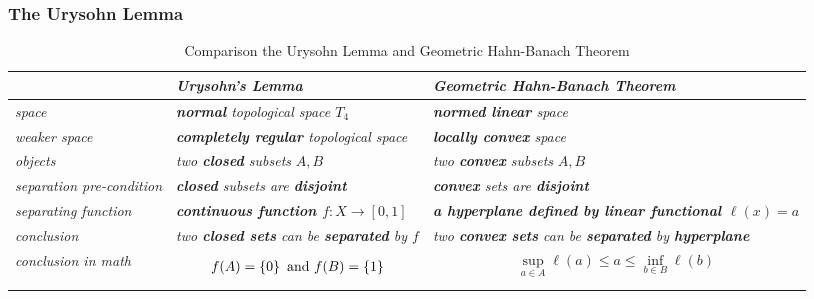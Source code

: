 \documentclass[11pt]{article}
\begin{document}
\subsubsection{The Urysohn Lemma}
\begin{table}[tb]
\setlength{\abovedisplayskip}{0pt}
\setlength{\belowdisplayskip}{-10pt}
\setlength{\abovedisplayshortskip}{0pt}
\setlength{\belowdisplayshortskip}{0pt}
\footnotesize
\centering
\caption{Comparison the Urysohn Lemma and Geometric Hahn-Banach Theorem}
\label{tab: separation}
\renewcommand\tabularxcolumn[1]{m{#1}}
\small
\begin{tabularx}{1\textwidth} { 
  | >{\raggedright\arraybackslash} m{2.5cm}
  | >{\centering\arraybackslash}X
  | >{\centering\arraybackslash}X  | }
 \hline
  &  \emph{Urysohn's Lemma}  & \emph{Geometric Hahn-Banach Theorem}   \\
  \hline \vspace{5pt}
\emph{space}    \vspace{2pt} & \emph{\textbf{normal} topological space $T_4$ }  & \emph{\textbf{normed linear} space} \\
\hline \vspace{5pt}
\emph{weaker space}    \vspace{2pt} & \emph{\textbf{completely regular} topological space}  & \emph{\textbf{locally convex} space} \\
 \hline \vspace{5pt}
\emph{objects}  \vspace{2pt} &  \emph{two \textbf{closed} subsets} $A, B$  & \emph{two \textbf{convex} subsets} $A, B$ \\
 \hline \vspace{5pt}
\emph{separation pre-condition}  \vspace{2pt} &  \emph{\textbf{closed} subsets are \textbf{disjoint} }  & \emph{\textbf{convex} sets are \textbf{disjoint} }   \\
 \hline \vspace{5pt}
\emph{separating function} \vspace{2pt}  &  \emph{\textbf{continuous function $f: X \rightarrow [0,1]$}}  & \emph{\textbf{a hyperplane defined by linear functional $\ell(x) = a$}}  \\
\hline \vspace{5pt}
\emph{conclusion}  \vspace{2pt}  & \emph{two \textbf{closed sets} can be \textbf{separated} by $f$} & \emph{two \textbf{convex sets} can be \textbf{separated} by \textbf{hyperplane}}
    \\
\hline \vspace{5pt}
\emph{conclusion in math} \vspace{2pt}  &  \begin{align*}
f(A) = \left\{0\right\}\text{ and }f(B) = \left\{1\right\}
\end{align*}  & \begin{align*}
\sup_{a \in A}\ell(a) \le a \le \inf_{b \in B}\ell(b)
\end{align*}   \\
\hline
\end{tabularx}
\end{table}
\end{document}

